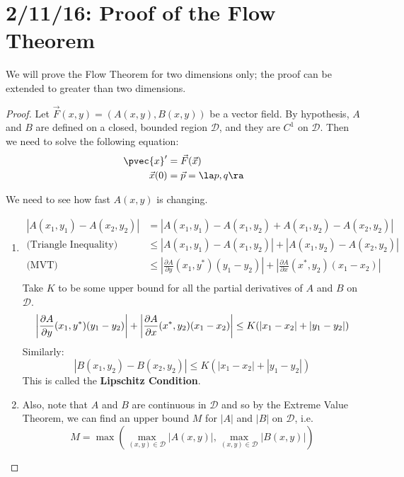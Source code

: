 \documentclass[12pt]{article}
\begin{document}
\section{2/11/16: Proof of the Flow Theorem}
We will prove the Flow Theorem for two dimensions only; the proof can be extended to greater than two dimensions.
\begin{proof}
Let $\vec{F}(x,y) = (A(x,y),B(x,y))$ be a vector field. By hypothesis, $A$ and $B$ are defined on a closed, bounded region $\mathcal{D}$, and they are $C^1$ on $\mathcal{D}$. Then we need to solve the following equation:
\[
\begin{aligned}
\pvec{x}' &= \vec{F}(\vec{x})\\
\vec{x}(0) &= \vec{p} = \la p,q \ra
\end{aligned}
\]

We need to see how fast $A(x,y)$ is changing.
\begin{enumerate}
\item \[ 
\begin{aligned}
|A(x_1,y_1) - A(x_2,y_2)| &= |A(x_1,y_1) - A(x_1,y_2) + A(x_1,y_2) - A(x_2,y_2)| \\
\text{(Triangle Inequality)}\qquad  &\le |A(x_1,y_1) - A(x_1,y_2)| + |A(x_1,y_2) - A(x_2,y_2)| \\
\text{(MVT)}\qquad &\le \left|\frac{\partial A}{\partial y}(x_1,y^*)(y_1 - y_2)\right| + \left|\frac{\partial A}{\partial x}(x^*,y_2)(x_1 - x_2)\right|\\
\end{aligned}
\]
Take $K$ to be some upper bound for all the partial derivatives of $A$ and $B$ on $\mathcal{D}$.
\[
\left|\frac{\partial A}{\partial y}(x_1,y^*)(y_1 - y_2)\right| + \left|\frac{\partial A}{\partial x}(x^*,y_2)(x_1 - x_2)\right| \le K(|x_1-x_2| + |y_1 - y_2|) \\
\]
Similarly:
\[ |B(x_1,y_2) - B(x_2,y_2)| \le K(|x_1-x_2|+|y_1-y_2|) \]
This is called the \textbf{Lipschitz Condition}.

\item Also, note that $A$ and $B$ are continuous in $\mathcal{D}$ and so by the Extreme Value Theorem, we can find an upper bound $M$ for $|A|$ and $|B|$ on $\mathcal{D}$, i.e. \[ M = \max\left(\max_{(x,y) \in \mathcal{D}}|A(x,y)|, \max_{(x,y) \in \mathcal{D}}|B(x,y)|\right) \]


\end{enumerate}
\end{proof}
\end{document}
